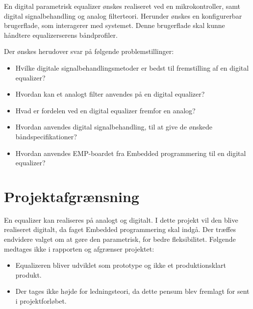 En digital parametrisk equalizer ønskes realiseret ved en mikrokontroller, samt digital signalbehandling og analog filterteori. Herunder ønskes en konfigurerbar brugerflade, som interagerer med systemet. Denne brugerflade skal kunne håndtere equalizerserens båndprofiler.\\

Der ønskes herudover svar på følgende problemstillinger:
\begin{itemize}[noitemsep,nolistsep]
	\item Hvilke digitale signalbehandlingsmetoder er bedst til fremstilling af en digital equalizer?
	\item Hvordan kan et analogt filter anvendes på en digital equalizer?
	\item Hvad er fordelen ved en digital equalizer fremfor en analog?
	\item Hvordan anvendes digital signalbehandling, til at give de ønskede båndspecifikationer?
	\item Hvordan anvendes EMP-boardet fra Embedded programmering til en digital equalizer?
\end{itemize}

\section{Projektafgrænsning}

En equalizer kan realiseres på analogt og digitalt. I dette projekt vil den blive realiseret digitalt, da faget Embedded programmering skal indgå. Der træffes endvidere valget om at gøre den parametrisk, for bedre fleksibilitet. Følgende medtages ikke i rapporten og afgrænser projektet:
\begin{itemize}[noitemsep,nolistsep]
	\item Equalizeren bliver udviklet som prototype og ikke et produktionsklart produkt.
	\item Der tages ikke højde for ledningsteori, da dette pensum blev fremlagt for sent i projektforløbet.
\end{itemize}

